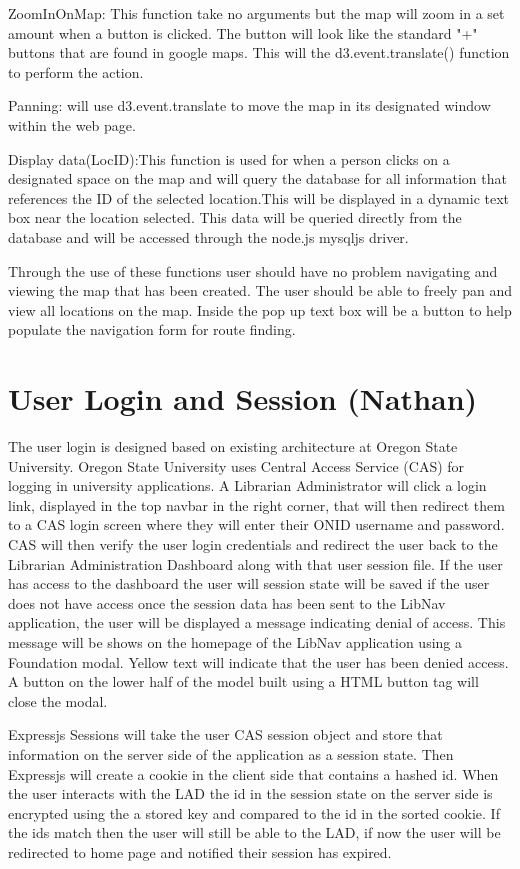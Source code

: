 \documentclass[letterpaper,10pt,titlepage, onecolumn, compsoc]{IEEEtran}
\begin{document}
ZoomInOnMap: This function take no arguments but the map will zoom in a set amount when a button is clicked. The button will look like the standard "+" buttons that are found in google maps. This will the d3.event.translate() function to perform the action.

Panning: will use d3.event.translate to move the map in its designated window within the web page. 

Display data(LocID):This function is used for when a person clicks on a designated space on the map and will query the database for all information that references the ID of the selected location.This will be displayed in a dynamic text box near the location selected. This data will be queried directly from the database and will be accessed through the node.js mysqljs driver.

Through the use of these functions user should have no problem navigating and viewing the map that has been created. The user should be able to freely pan and view all locations on the map. Inside the pop up text box will be a button to help populate the navigation form for route finding.

\section{User Login and Session (Nathan)}
The user login is designed based on existing architecture at Oregon State University.  Oregon State University uses Central Access Service (CAS) for logging in university applications. A Librarian Administrator will click a login link, displayed in the top navbar in the right corner, that will then redirect them to a CAS login screen where they will enter their ONID username and password. CAS will then verify the user login credentials and redirect the user back to the Librarian Administration Dashboard along with that user session file. If the user has access to the dashboard the user will session state will be saved if the user does not have access once the session data has been sent to the LibNav application, the user will be displayed a message indicating denial of access. This message will be shows on the homepage of the LibNav application using a Foundation modal. Yellow text will indicate that the user has been denied access. A button on the lower half of the model built using a HTML button tag  will close the modal.

Expressjs Sessions will take the user CAS session object  and store that information on the server side of the application as a session state. Then Expressjs will create a cookie in the client side that contains a hashed id. When the user interacts with the LAD the id in the session state on the server side is encrypted using the a stored key and compared to the id in the sorted cookie. If the ids match then the user will still be able to the LAD, if now the user will be redirected to home page and notified their session has expired. 
\end{document}
